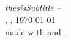 \null
\vfill
\begin{flushright}
    \textbf{\thesisAuthor}\\
    \thesisAuthorAddress\\
    \href{mailto:\thesisAuthorEmail}{\thesisAuthorEmail}\\
    \href{http://\thesisAuthorWebsite}{\thesisAuthorWebsite}\\
    \vspace{12pt}
    \textit{\textbf{
	    \thesisTitle{}}
	    \ifcsname thesisSubtitle \endcsname
		    -- \thesisSubtitle
		\else
		\fi
		}\\
    \thesisDesignator{}, \thesisUniversity{}, \today\\
    \vspace{12pt}
    made with \XeTeX{} and \BibTeX{}.
\end{flushright}